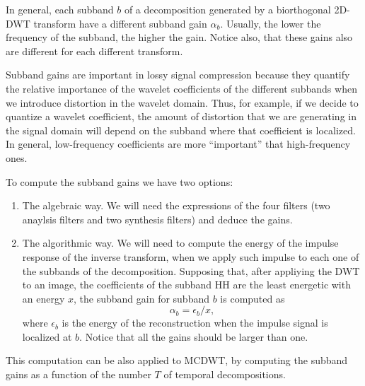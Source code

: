 In general, each subband $b$ of a decomposition generated by a
biorthogonal 2D-DWT transform have a different subband gain
$\alpha_b$. Usually, the lower the frequency of the subband, the
higher the gain. Notice also, that these gains also are different for
each different transform.

Subband gains are important in lossy signal compression because they
quantify the relative importance of the wavelet coefficients of the
different subbands when we introduce distortion in the wavelet
domain. Thus, for example, if we decide to quantize a wavelet
coefficient, the amount of distortion that we are generating in the
signal domain will depend on the subband where that coefficient is
localized. In general, low-frequency coefficients are more
``important'' that high-frequency ones.

To compute the subband gains we have two options:
\begin{enumerate}
\item The algebraic way. We will need the expressions of the four
  filters (two anaylsis filters and two synthesis filters) and deduce
  the gains.
\item The algorithmic way. We will need to compute the energy of the
  impulse response of the inverse transform, when we apply such
  impulse to each one of the subbands of the decomposition. Supposing
  that, after appliying the DWT to an image, the coefficients of the
  subband HH are the least energetic with an energy $x$, the subband
  gain for subband $b$ is computed as
  \begin{equation}
    \alpha_b = \epsilon_b/x,
  \end{equation}
  where $\epsilon_b$ is the energy of the reconstruction when the
  impulse signal is localized at $b$. Notice that all the gains should
  be larger than one.
\end{enumerate}

This computation can be also applied to MCDWT, by computing the subband
gains as a function of the number $T$ of temporal decompositions.

